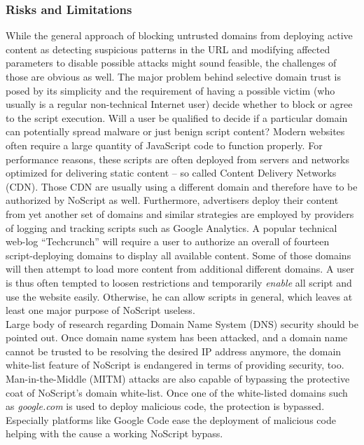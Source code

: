     \subsubsection{Risks and Limitations}
    \label{subsubsec:4.4.5.risks_and_limitations}

    While the general approach of blocking untrusted domains from deploying active content as detecting suspicious patterns in the URL and modifying affected parameters to disable possible attacks might sound feasible, the challenges of those are obvious as well. The major problem behind selective domain trust is posed by its simplicity and the requirement of having a possible victim (who usually is a regular non-technical Internet user) decide whether to block or agree to the script execution. Will a user be qualified to decide if a particular domain can potentially spread malware or just benign script content? Modern websites often require a large quantity of JavaScript code to function properly. For performance reasons, these scripts are often deployed from servers and networks optimized for delivering static content -- so called Content Delivery Networks (CDN). Those CDN are usually using a different domain and therefore have to be authorized by NoScript as well. Furthermore, advertisers deploy their 
content from yet another set of domains and similar strategies are employed by providers of logging and tracking scripts such as Google Analytics. A popular technical web-log ``Techcrunch'' will require a user to authorize an overall of fourteen script-deploying domains to display all available content. Some of those domains will then attempt to load more content from additional different domains. A user is thus often tempted to loosen restrictions and temporarily \textit{enable} all script and use the website easily. Otherwise, he can allow scripts in general, which leaves at least one major purpose of NoScript useless. \\

    Large body of research regarding Domain Name System (DNS) security should be pointed out. Once domain name system has been attacked, and a domain name cannot be trusted to be resolving the desired IP address anymore, the domain white-list feature of NoScript is endangered in terms of providing security, too. Man-in-the-Middle (MITM) attacks are also capable of bypassing the protective coat of NoScript's domain white-list. Once one of the white-listed domains such as \textit{google.com} is used to deploy malicious code, the protection is bypassed. Especially platforms like Google Code ease the deployment of malicious code helping with the cause a working NoScript bypass.\\

